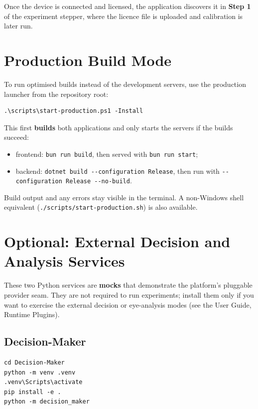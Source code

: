 Once the device is connected and licensed, the application discovers it in \textbf{Step 1} of the
experiment stepper, where the licence file is uploaded and calibration is later run.

\FloatBarrier
\section{Production Build Mode}\label{7-production-build-mode}

To run optimised builds instead of the development servers, use the production launcher from the
repository root:

\begin{Verbatim}[breaklines=true,breakanywhere=true,fontsize=\small]
.\scripts\start-production.ps1 -Install
\end{Verbatim}

This first \textbf{builds} both applications and only starts the servers if the builds succeed:

\begin{itemize}
\tightlist
\item
  frontend: \texttt{bun\ run\ build}, then served with \texttt{bun\ run\ start};
\item
  backend: \texttt{dotnet\ build\ -\/-configuration\ Release}, then run with \texttt{-\/-configuration\ Release\ -\/-no-build}.
\end{itemize}

Build output and any errors stay visible in the terminal. A non-Windows shell equivalent
(\texttt{./scripts/start-production.sh}) is also available.

\FloatBarrier
\section{Optional: External Decision and Analysis Services}\label{8-optional-external-decision-and-analysis-services}

These two Python services are \textbf{mocks} that demonstrate the platform's pluggable provider seam.
They are not required to run experiments; install them only if you want to exercise the external
decision or eye-analysis modes (see the User Guide, Runtime Plugins).

\subsection{Decision-Maker}\label{81-decision-maker}

\begin{Verbatim}[breaklines=true,breakanywhere=true,fontsize=\small]
cd Decision-Maker
python -m venv .venv
.venv\Scripts\activate
pip install -e .
python -m decision_maker
\end{Verbatim}


